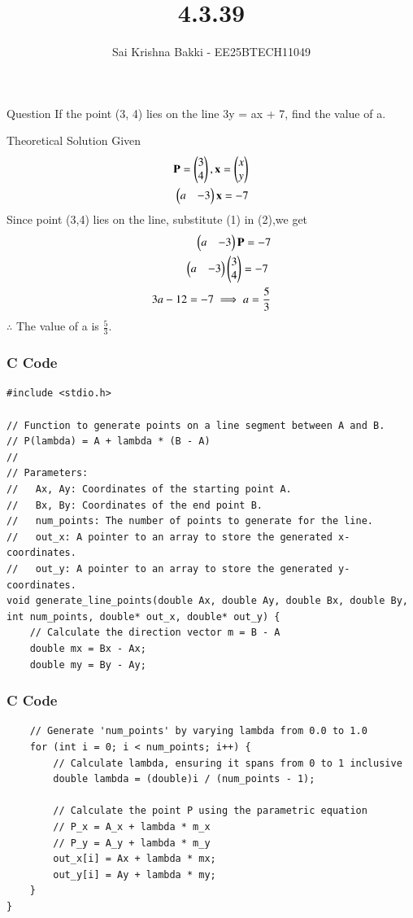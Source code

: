 \documentclass{beamer}
\title %
{4.3.39}
\date{}
\author %
{Sai Krishna Bakki - EE25BTECH11049}
\begin{document}
\frame{\titlepage}
\begin{frame}{Question}
    If the point (3, 4) lies on the line 3y = ax + 7, find the value of a.
\end{frame}
\begin{frame}{Theoretical Solution}
    Given
\begin{align}
    \mathbf{P}=\begin{pmatrix}3\\4\end{pmatrix},\mathbf{x}=\begin{pmatrix}x\\y\end{pmatrix}\\
    \begin{pmatrix}a & -3\end{pmatrix}\mathbf{x}=-7
\end{align}
Since point (3,4) lies on the line, substitute (1) in (2),we get
\begin{align}
        \begin{pmatrix}a & -3\end{pmatrix}\mathbf{P}=-7\\
        \begin{pmatrix}a & -3\end{pmatrix}\begin{pmatrix}3\\4\end{pmatrix}=-7\ \\
        3a-12=-7\implies a=\frac{5}{3}
\end{align}
$\therefore$ The value of a is \textbf{$\frac{5}{3}$}.
\end{frame}
\begin{frame}[fragile]
\frametitle{C Code }
\begin{lstlisting}
#include <stdio.h>

// Function to generate points on a line segment between A and B.
// P(lambda) = A + lambda * (B - A)
//
// Parameters:
//   Ax, Ay: Coordinates of the starting point A.
//   Bx, By: Coordinates of the end point B.
//   num_points: The number of points to generate for the line.
//   out_x: A pointer to an array to store the generated x-coordinates.
//   out_y: A pointer to an array to store the generated y-coordinates.
void generate_line_points(double Ax, double Ay, double Bx, double By, int num_points, double* out_x, double* out_y) {
    // Calculate the direction vector m = B - A
    double mx = Bx - Ax;
    double my = By - Ay;
\end{lstlisting}    
\end{frame}
\begin{frame}[fragile]
\frametitle{C Code }
\begin{lstlisting}
    // Generate 'num_points' by varying lambda from 0.0 to 1.0
    for (int i = 0; i < num_points; i++) {
        // Calculate lambda, ensuring it spans from 0 to 1 inclusive
        double lambda = (double)i / (num_points - 1);

        // Calculate the point P using the parametric equation
        // P_x = A_x + lambda * m_x
        // P_y = A_y + lambda * m_y
        out_x[i] = Ax + lambda * mx;
        out_y[i] = Ay + lambda * my;
    }
}
\end{lstlisting}    
\end{frame}
\end{document}
